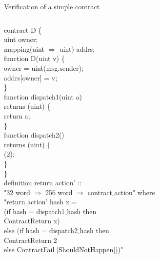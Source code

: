 \documentclass{beamer}
\begin{document}
\begin{frame}{Verification of a simple contract}
		\ttfamily
		\footnotesize
	\begin{columns}[c]
		\textcolor{Data61 ocean blue}{contract} D \{ \\
		\quad	\textcolor{Data61 midnight blue}{uint} owner;\\
		\quad	\textcolor{Data61 midnight blue}{mapping(uint $\Rightarrow$ uint)} addrs;\\
			
		\quad	\textcolor{Data61 ocean blue}{function} D(\textcolor{Data61 midnight blue}{uint} v) \{\\
		\quad\quad	owner = uint(msg.sender);\\
		\quad\quad	addrs[owner] = v;\\
		\quad	\}\\
		\quad	\textcolor{Data61 ocean blue}{function} dispatch1(\textcolor{Data61 midnight blue}{uint} a)\\
		\quad	\textcolor{Data61 ocean blue}{returns} (\textcolor{Data61 midnight blue}{uint}) \{\\
		\quad\quad	return a;\\
		\quad	\}\\
		\quad	\textcolor{Data61 ocean blue}{function} dispatch2()\\
		\quad	\textcolor{Data61 ocean blue}{returns} (\textcolor{Data61 midnight blue}{uint}) \{\\
		\quad{} (2);\\
		\quad	\}\\
		\}\\
		
		\textcolor{Data61 dark mint}{definition} return$\_$action' ::\\
		"32 word $\Rightarrow$ 256 word $\Rightarrow$ contract$\_$action" \textcolor{Data61 dark mint}{where}\\
		"return$\_$action' hash x = \\
		(\textcolor{Data61 dark mint}{if} hash = dispatch1$\_$hash \textcolor{Data61 dark mint}{then}\\
		ContractReturn x)\\
		\textcolor{Data61 dark mint}{else} (\textcolor{Data61 dark mint}{if} hash = dispatch2$\_$hash \textcolor{Data61 dark mint}{then}\\
		ContractReturn 2\\
		\textcolor{Data61 dark mint}{else} ContractFail [ShouldNotHappen]))"
	\end{columns}
\end{frame}
\end{document}
